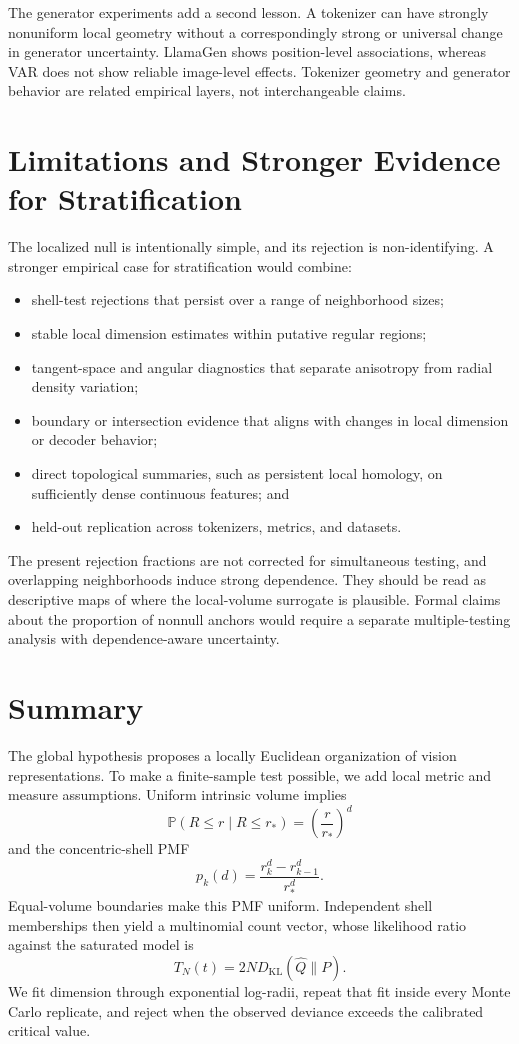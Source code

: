 \documentclass[11pt]{article}
\newcommand{\Prb}{\mathbb{P}}
\newcommand{\KL}{D_{\mathrm{KL}}}
\begin{document}
The generator experiments add a second lesson. A tokenizer can have strongly
nonuniform local geometry without a correspondingly strong or universal change
in generator uncertainty. LlamaGen shows position-level associations, whereas
VAR does not show reliable image-level effects. Tokenizer geometry and
generator behavior are related empirical layers, not interchangeable claims.

\section{Limitations and Stronger Evidence for Stratification}

The localized null is intentionally simple, and its rejection is
non-identifying. A stronger empirical case for stratification would combine:
\begin{itemize}
  \item shell-test rejections that persist over a range of neighborhood sizes;
  \item stable local dimension estimates within putative regular regions;
  \item tangent-space and angular diagnostics that separate anisotropy from
  radial density variation;
  \item boundary or intersection evidence that aligns with changes in local
  dimension or decoder behavior;
  \item direct topological summaries, such as persistent local homology, on
  sufficiently dense continuous features; and
  \item held-out replication across tokenizers, metrics, and datasets.
\end{itemize}

The present rejection fractions are not corrected for simultaneous testing,
and overlapping neighborhoods induce strong dependence. They should be read as
descriptive maps of where the local-volume surrogate is plausible. Formal
claims about the proportion of nonnull anchors would require a separate
multiple-testing analysis with dependence-aware uncertainty.

\section{Summary}

The global hypothesis proposes a locally Euclidean organization of vision
representations. To make a finite-sample test possible, we add local metric and
measure assumptions. Uniform intrinsic volume implies
\[
  \Prb(R\le r\mid R\le r_\ast)=\left(\frac{r}{r_\ast}\right)^d
\]
and the concentric-shell PMF
\[
  p_k(d)=\frac{r_k^d-r_{k-1}^d}{r_\ast^d}.
\]
Equal-volume boundaries make this PMF uniform. Independent shell memberships
then yield a multinomial count vector, whose likelihood ratio against the
saturated model is
\[
  T_N(t)=2N\KL(\widehat Q\|P).
\]
We fit dimension through exponential log-radii, repeat that fit inside every
Monte Carlo replicate, and reject when the observed deviance exceeds the
calibrated critical value.
\end{document}
